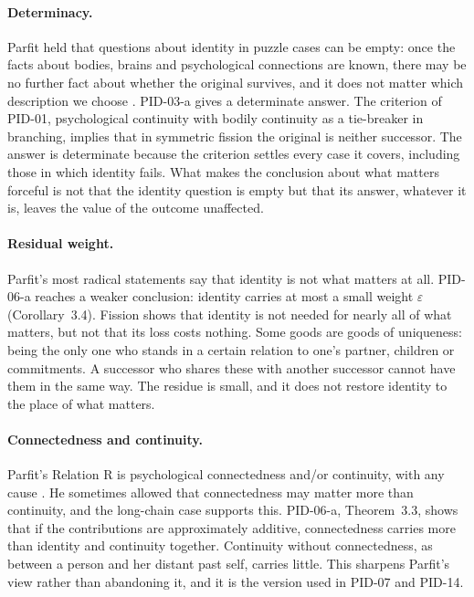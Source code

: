 \documentclass{situationist-preprint}
\begin{document}
\paragraph{Determinacy.} Parfit held that questions about identity in puzzle cases can be empty: once the facts about bodies, brains and psychological connections are known, there may be no further fact about whether the original survives, and it does not matter which description we choose \citep[ch.~11]{Parfit1984}. PID-03-a gives a determinate answer. The criterion of PID-01, psychological continuity with bodily continuity as a tie-breaker in branching, implies that in symmetric fission the original is neither successor. The answer is determinate because the criterion settles every case it covers, including those in which identity fails. What makes the conclusion about what matters forceful is not that the identity question is empty but that its answer, whatever it is, leaves the value of the outcome unaffected.

\paragraph{Residual weight.} Parfit's most radical statements say that identity is not what matters at all. PID-06-a reaches a weaker conclusion: identity carries at most a small weight $\varepsilon$ (Corollary~3.4). Fission shows that identity is not needed for nearly all of what matters, but not that its loss costs nothing. Some goods are goods of uniqueness: being the only one who stands in a certain relation to one's partner, children or commitments. A successor who shares these with another successor cannot have them in the same way. The residue is small, and it does not restore identity to the place of what matters.

\paragraph{Connectedness and continuity.} Parfit's Relation R is psychological connectedness and/or continuity, with any cause \citep[ch.~12]{Parfit1984}. He sometimes allowed that connectedness may matter more than continuity, and the long-chain case supports this. PID-06-a, Theorem~3.3, shows that if the contributions are approximately additive, connectedness carries more than identity and continuity together. Continuity without connectedness, as between a person and her distant past self, carries little. This sharpens Parfit's view rather than abandoning it, and it is the version used in PID-07 and PID-14.
\end{document}
